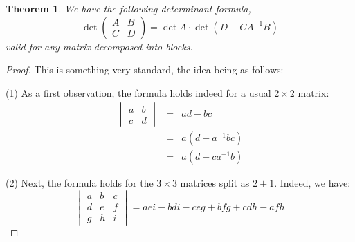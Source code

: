 \documentclass[12pt]{amsbook}
\newtheorem{theorem}{Theorem}[chapter]
\begin{document}
\begin{theorem}
We have the following determinant formula,
$$\det\begin{pmatrix}A&B\\C&D\end{pmatrix}
=\det A\cdot \det(D-CA^{-1}B)$$
valid for any matrix decomposed into blocks.
\end{theorem}

\begin{proof}
This is something very standard, the idea being as follows:

\medskip

(1) As a first observation, the formula holds indeed for a usual $2\times2$ matrix:
\begin{eqnarray*}
\begin{vmatrix}
a&b\\ c&d\end{vmatrix}
&=&ad-bc\\
&=&a(d-a^{-1}bc)\\
&=&a(d-ca^{-1}b)
\end{eqnarray*}

(2) Next, the formula holds for the $3\times3$ matrices split as $2+1$. Indeed, we have:
$$\begin{vmatrix}
a&b&c\\ d&e&f\\ g&h&i\end{vmatrix}
=aei-bdi-ceg+bfg+cdh-afh$$


\end{proof}
\end{document}
